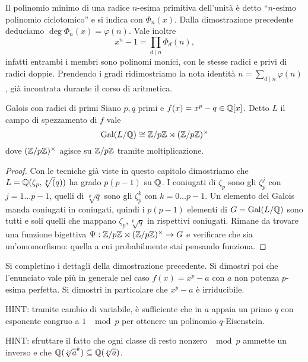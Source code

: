 Il polinomio minimo di una radice $n$-esima primitiva dell'unità è detto ``$n$-esimo polinomio ciclotomico'' e si indica con $\Phi_n(x)$. Dalla dimostrazione precedente deduciamo $\deg \Phi_n(x) = \varphi(n)$. Vale inoltre
\[
    x^n - 1 = \prod_{d \mid n}{\Phi_d(n)},
\]
infatti entrambi i membri sono polinomi monici, con le stesse radici e privi di radici doppie. Prendendo i gradi ridimostriamo la nota identità $n = \sum_{d \mid n}{\varphi(n)}$, già incontrata durante il corso di aritmetica.

\begin{theorem}{Galois con radici di primi}
    Siano $p, q$ primi e $f(x) = x^p -  q \in \mathbb{Q}[x]$. Detto $L$ il campo di spezzamento di
    $f$ vale
    \[
        \text{Gal}(L/\mathbb{Q}) \cong \mathbb{Z}/p\mathbb{Z} \rtimes (\mathbb{Z}/p\mathbb{Z})^\times
    \]
    dove $(\mathbb{Z}/p\mathbb{Z})^\times$ agisce su $\mathbb{Z}/p\mathbb{Z}$ tramite moltiplicazione.
\end{theorem}
\begin{proof}
    Con le tecniche già viste in questo capitolo dimostriamo che $L = \mathbb{Q}(\zeta_p, \sqrt[p](q))$ ha grado $p(p-1)$ su $\mathbb{Q}$. I coniugati di $\zeta_p$ sono gli $\zeta_p^j$ con $j = 1 \dots p-1$, quelli di $\sqrt[p]{q}$ sono gli $\zeta_p^k$ con $k = 0\dots p-1$. Un elemento del Galois manda coniugati in coniugati, quindi i $p(p-1)$ elementi di $G = \text{Gal}(L/\mathbb{Q})$ sono tutti e soli quelli che mappano $\zeta_p,\sqrt[p]{q}$ in rispettivi coniugati. Rimane da trovare una funzione bigettiva $\Psi : \mathbb{Z}/p\mathbb{Z} \rtimes (\mathbb{Z}/p\mathbb{Z})^\times \to G$ e verificare che sia un'omomorfismo: quella a cui probabilmente stai pensando funziona.
\end{proof}

\begin{exercise}
    Si completino i dettagli della dimostrazione precedente. Si dimostri poi che l'enunciato vale più in generale nel caso $f(x) = x^p - a$ con $a$ non potenza $p$-esima perfetta. Si dimostri in particolare che $x^p - a$ è irriducibile.

    \tiny{HINT: tramite cambio di variabile, è sufficiente che in $a$ appaia un primo $q$ con esponente congruo a $1$ $\mod p$ per ottenere un polinomio $q$-Eisenstein.}

    \tiny{HINT: sfruttare il fatto che ogni classe di resto nonzero $\mod p$ ammette un inverso e che $\mathbb{Q}(\sqrt[p]{a}^k) \subseteq \mathbb{Q}(\sqrt[p]{a})$}.
\end{exercise}

